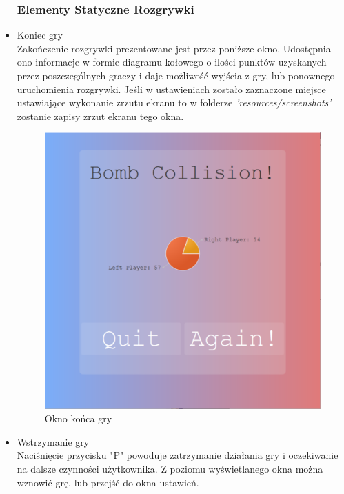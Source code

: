 \documentclass[11pt,a4paper]{report}
\begin{document}
\begin{itemize}
\subsubsection{Elementy Statyczne Rozgrywki}
\item{Koniec gry}\\
Zakończenie rozgrywki prezentowane jest przez poniższe okno. Udostępnia ono informacje w formie diagramu kołowego o ilości punktów uzyskanych przez poszczególnych graczy i daje możliwość wyjścia z gry, lub ponownego uruchomienia rozgrywki. Jeśli w ustawieniach zostało zaznaczone miejsce ustawiające wykonanie zrzutu ekranu to w folderze \textsl{'resources/screenshots'} zostanie zapisy zrzut ekranu tego okna.
\begin{figure}[!ht]
\centerline{\includegraphics{img/koniec.png}}
\caption{ Okno końca gry }
\end{figure}
\newpage
\item{Wstrzymanie gry}\\
Naciśnięcie przycisku "P" powoduje zatrzymanie działania gry i oczekiwanie na dalsze czynności użytkownika. Z poziomu wyświetlanego okna można wznowić grę, lub przejść do okna ustawień.
\begin{figure}[!ht]

\end{figure}
\end{itemize}
\end{document}
